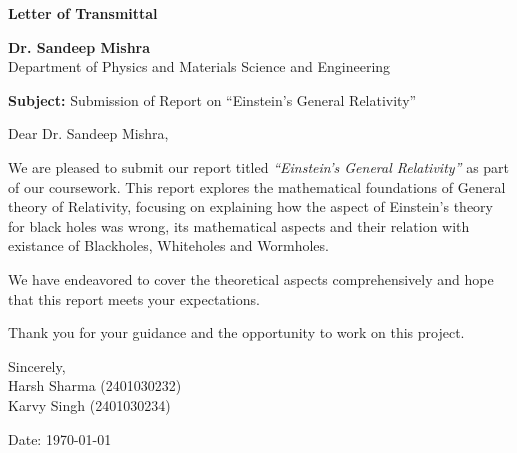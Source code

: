 \documentclass[12pt,a4paper]{article}
\begin{document}
\begin{center}
    \Large\textbf{Letter of Transmittal}
\end{center}
\vspace{1cm}

\noindent
\textbf{Dr. Sandeep Mishra} \\
[0.5em]
Department of Physics and Materials Science and Engineering\\
[0.5em]

\vspace{1cm}

\noindent
\textbf{Subject:} Submission of Report on ``Einstein's General Relativity''

\vspace{1cm}

\noindent
Dear Dr. Sandeep Mishra,

\vspace{1em}

\noindent
We are pleased to submit our report titled \textit{``Einstein's General Relativity''} as part of our coursework. This report explores the mathematical foundations of General theory of Relativity, focusing on explaining how the aspect of Einstein's theory for black holes was wrong, its mathematical aspects and their relation with existance of Blackholes, Whiteholes and Wormholes.

\vspace{1em}

\noindent
We have endeavored to cover the theoretical aspects comprehensively and hope that this report meets your expectations.

\vspace{1em}

\noindent
Thank you for your guidance and the opportunity to work on this project.

\vspace{2em}

\noindent
Sincerely, \\[2em]

\noindent
Harsh Sharma (2401030232)\\
Karvy Singh (2401030234)\\

\vspace{2cm}

\noindent
Date: \today

\newpage
\end{document}
